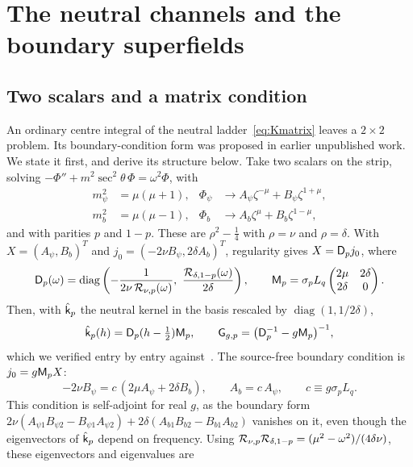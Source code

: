 \section{The neutral channels and the boundary superfields}
\label{sec:neutral}

\subsection{Two scalars and a matrix condition}

An ordinary centre integral of the neutral ladder~\eqref{eq:Kmatrix} leaves a $2\times2$ problem. Its boundary-condition form was proposed in earlier unpublished work. We state it first, and derive its structure below. Take two scalars on the strip, solving $-\Phi''+m^2\sec^2\theta\,\Phi=\omega^2\Phi$, with
\begin{equation}\label{eq:scalars}
\begin{aligned}
m_\psi^2&=\mu(\mu+1),&\Phi_\psi&\to A_\psi\zeta^{-\mu}+B_\psi\zeta^{1+\mu},\\
m_b^2&=\mu(\mu-1),&\Phi_b&\to A_b\zeta^{\mu}+B_b\zeta^{1-\mu},
\end{aligned}
\end{equation}
and with parities $p$ and $1-p$. These are $\rho^2-\tfrac14$ with $\rho=\nu$ and $\rho=\delta$. With $X=(A_\psi,B_b)^T$ and $j_0=(-2\nu B_\psi,2\delta A_b)^T$, regularity gives $X=\mathsf{D}_pj_0$, where
\begin{equation}\label{eq:Dp}
\sD_p(\omega)=\operatorname{diag}\left(-\frac{1}{2\nu\,\cR_{\nu,p}(\omega)},\ \frac{\cR_{\delta,1-p}(\omega)}{2\delta}\right),\qquad\sM_p=\sigma_pL_q\begin{pmatrix}2\mu&2\delta\\2\delta&0\end{pmatrix}.
\end{equation}
Then, with $\hat{\mathsf{k}}_p$ the neutral kernel in the basis rescaled by $\operatorname{diag}(1,1/2\delta)$,
\begin{equation}\label{eq:khat}
\hat{\mathsf{k}}_p(h)=\mathsf{D}_p(h-\tfrac12)\mathsf{M}_p,\qquad\mathsf{G}_{g,p}=\big(\mathsf{D}_p^{-1}-g\mathsf{M}_p\big)^{-1},
\end{equation}
which we verified entry by entry against~\cite[(2.27)--(2.29), (2.33)--(2.35)]{Peng:2017spg}. The source-free boundary condition is $j_0=g\mathsf{M}_pX$:
\begin{equation}\label{eq:bc-matrix}
-2\nu B_\psi=c\,(2\mu A_\psi+2\delta B_b),\qquad A_b=c\,A_\psi,\qquad c\equiv g\sigma_pL_q.
\end{equation}
This condition is self-adjoint for real $g$, as the boundary form $2\nu(A_{\psi1}B_{\psi2}-B_{\psi1}A_{\psi2})+2\delta(A_{b1}B_{b2}-B_{b1}A_{b2})$ vanishes on it, even though the eigenvectors of $\hat{\mathsf{k}}_p$ depend on frequency. Using $\mathcal{R}_{\nu,p}\mathcal{R}_{\delta,1-p}=(\mu^2-\omega^2)/(4\delta\nu)$, these eigenvectors and eigenvalues are
